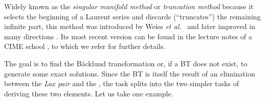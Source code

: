 \documentclass[10pt]{article}
\begin{document}
Widely known as the
\textit{singular manifold method} or \textit{truncation method}
because it selects
the beginning of a Laurent series and discards (``truncates'')
the remaining infinite part,
this method was introduced by Weiss \textit{et al.}~\cite{WTC}
and later improved in many directions
\cite{MC1991,EstevezEtAl1993,Garagash1993}
\cite{MC1994,CMGalli1995,Pickering1996SMM,MC1998}.
Its most recent version can be found in 
the lecture notes of a CIME school \cite{CetraroConte,CetraroMusette},
to which we refer for further details.

The goal is to find the B\"acklund transformation or,
if a BT does not exist,
to generate some exact solutions.
Since the BT is itself the result of an elimination \cite{Chen1974}
between the \textit{Lax pair} and the \textit{\formerDT},
the task splits into the two simpler tasks of deriving these two elements.
Let us take one example.

\end{document}
